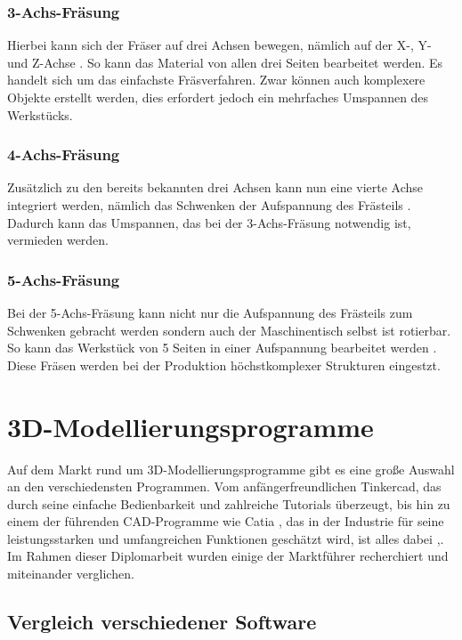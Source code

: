 \subsubsection{3-Achs-Fräsung}
Hierbei kann sich der Fräser auf drei Achsen bewegen, nämlich auf der X-, Y- und Z-Achse \textcite{Fraesen345Achs}. So kann das Material von allen drei Seiten bearbeitet werden. Es handelt sich um das einfachste Fräsverfahren. Zwar können auch komplexere Objekte erstellt werden, dies erfordert jedoch ein mehrfaches Umspannen des Werkstücks.

\subsubsection{4-Achs-Fräsung}
Zusätzlich zu den bereits bekannten drei Achsen kann nun eine vierte Achse integriert werden, nämlich das Schwenken der Aufspannung des Frästeils \textcite{Fraesen345Achs}. Dadurch kann das Umspannen, das bei der 3-Achs-Fräsung notwendig ist, vermieden werden.

\subsubsection{5-Achs-Fräsung}
Bei der 5-Achs-Fräsung kann nicht nur die Aufspannung des Frästeils zum Schwenken gebracht werden sondern auch der Maschinentisch selbst ist rotierbar. So kann das Werkstück von 5 Seiten in einer Aufspannung bearbeitet werden \textcite{Fraesen345Achs}. Diese Fräsen werden bei der Produktion höchstkomplexer Strukturen eingestzt.\\



\section{3D-Modellierungsprogramme}
Auf dem Markt rund um 3D-Modellierungsprogramme gibt es eine große Auswahl an den verschiedensten Programmen. Vom anfängerfreundlichen Tinkercad, das durch seine einfache Bedienbarkeit und zahlreiche Tutorials überzeugt, bis hin zu einem der führenden CAD-Programme wie Catia  \textcite{3DPrintingSoftware}, das in der Industrie für seine leistungsstarken und umfangreichen Funktionen geschätzt wird, ist alles dabei \textcite{CADProgramme},. Im Rahmen dieser Diplomarbeit wurden einige der Marktführer recherchiert und miteinander verglichen. \\


\subsection{Vergleich verschiedener Software}

